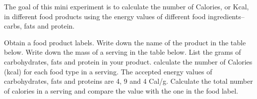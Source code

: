 \documentclass[main.tex]{subfiles}
\begin{document}
\newpage
 \vspace{0.2cm}{\large \bfseries 2. Food value in food}
The goal of this mini experiment is to calculate the number of Calories, or Kcal, in different food products using the energy values of different food ingredients--carbs, fats and protein.
\begin{steps}
    \newstep[] Obtain a food product labels.
        \newstep[]  Write down the name of the product in the table below.
        \newstep[]  Write down the mass of a serving in the table below.
        \newstep[]  List the grams of carbohydrates, fats and protein in your product.
                \newstep[]  calculate the number of Calories (kcal) for each food type in a serving. The accepted energy values of carbohydrates, fats and proteins are 4, 9 and 4 Cal/g.
                \newstep[] Calculate the total number of calories in a serving and compare the value with the one in the food label. 
\end{steps}
\end{document}
